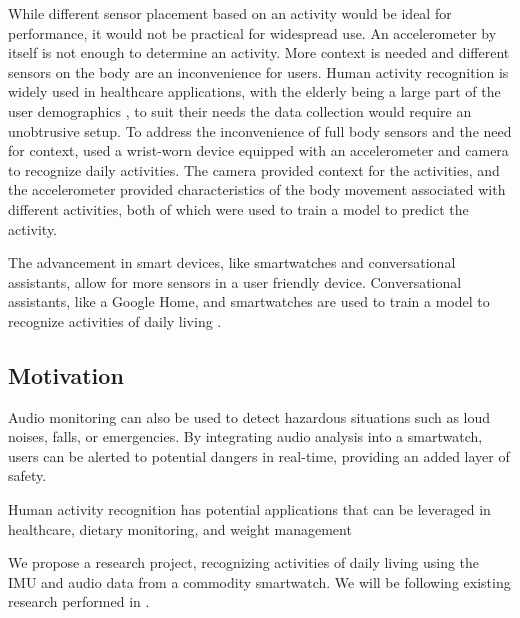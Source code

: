 \documentclass[conference]{IEEEtran}
\begin{document}
While different sensor placement based on an activity would be ideal for performance, it would not be practical for widespread use.
An accelerometer by itself is not enough to determine an activity. More context is needed and different sensors on the body are an inconvenience for users. 
Human activity recognition is widely used in healthcare applications, with the elderly being a large part of the user demographics \cite{2018_Robust_Activity}, to suit their needs the data collection would require an unobtrusive setup.
To address the inconvenience of full body sensors and the need for context, \cite{2012_WristSense} used a wrist-worn device equipped with an accelerometer and camera to recognize daily activities. 
The camera provided context for the activities, and the accelerometer provided characteristics of the body movement associated with different activities, both of which were used to train a model to predict the activity.

The advancement in smart devices, like smartwatches and conversational assistants, allow for more sensors in a user friendly device.
Conversational assistants, like a Google Home, and smartwatches are used to train a model to recognize activities of daily living \cite{2021_Ok_Google} \cite{2022_Leveraging_sound}.



\subsection{Motivation}
Audio monitoring can also be used to detect hazardous situations such as loud noises, falls, or emergencies. By integrating audio analysis into a smartwatch, users can be alerted to potential dangers in real-time, providing an added layer of safety.

Human activity recognition has potential applications that can be leveraged in healthcare, dietary monitoring, and weight management

We propose a research project, recognizing activities of daily living using the IMU and audio data from a commodity smartwatch. 
We will be following existing research performed in \cite{2022_Leveraging_sound}. 
\end{document}

